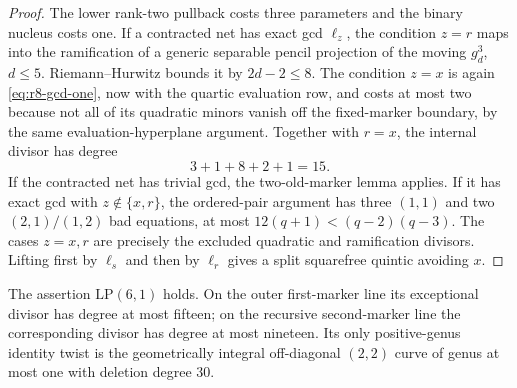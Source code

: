 \begin{proof}
The lower rank-two pullback costs three
parameters and the binary nucleus costs one.  If a contracted net has
exact gcd $\ell_z$, the condition $z=r$ maps into the ramification of
a generic separable pencil projection of the moving $g^3_d$, $d\leq5$.
Riemann--Hurwitz bounds it by $2d-2\leq8$.  The condition $z=x$ is
again \eqref{eq:r8-gcd-one}, now with the quartic evaluation row, and
costs at most two
because not all of its quadratic minors vanish off the fixed-marker
boundary, by the same evaluation-hyperplane argument.  Together
with $r=x$, the internal divisor has degree
\begin{equation}\label{eq:r8-outer-budget}
 3+1+8+2+1=15.
\end{equation}
If the contracted net has trivial gcd, the two-old-marker lemma applies.
If it has exact gcd with $z\notin\{x,r\}$, the ordered-pair argument has three
$(1,1)$ and two $(2,1)/(1,2)$ bad equations, at most
$12(q+1)<(q-2)(q-3)$.  The cases $z=x,r$ are precisely the excluded
quadratic and ramification divisors.
Lifting first by $\ell_s$ and then by $\ell_r$ gives a split
squarefree quintic avoiding $x$.
\end{proof}

\begin{proposition}\label{prop:r8-lp61}%
%
The assertion $\mathrm{LP}(6,1)$ holds.  On the outer first-marker
line its exceptional divisor has degree at most fifteen; on the
recursive second-marker line the corresponding divisor has degree at
most nineteen.  Its only positive-genus identity twist is the
geometrically integral off-diagonal $(2,2)$ curve of genus at most one
with deletion degree $30$.
\end{proposition}


